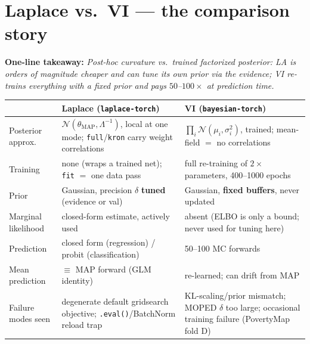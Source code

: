 \documentclass[10pt,a4paper]{article}
\newcommand{\code}[1]{\texttt{#1}}
\newcommand{\map}{\mathrm{MAP}}
\newcommand{\takeaway}[1]{\textbf{One-line takeaway:} \emph{#1}}
\begin{document}
\section{Laplace vs.\ VI --- the comparison story}\label{sec:compare}
\takeaway{Post-hoc curvature vs.\ trained factorized posterior: LA is orders of magnitude cheaper
and can tune its own prior via the evidence; VI re-trains everything with a fixed prior and pays
$50$--$100\times$ at prediction time.}

\begin{center}\small
\begin{tabular}{p{3.0cm}p{5.6cm}p{5.6cm}}
\toprule
& \textbf{Laplace (\code{laplace-torch})} & \textbf{VI (\code{bayesian-torch})}\\
\midrule
Posterior approx. & $\mathcal{N}(\theta_\map,\Lambda^{-1})$, local at one mode; \code{full}/\code{kron}
carry weight correlations & $\prod_i\mathcal{N}(\mu_i,\sigma_i^2)$, trained; mean-field $=$ no
correlations\\
Training & none (wraps a trained net); \code{fit} $=$ one data pass & full re-training of $2\times$
parameters, 400--1000 epochs\\
Prior & Gaussian, precision $\delta$ \textbf{tuned} (evidence or val) & Gaussian, \textbf{fixed
buffers}, never updated\\
Marginal likelihood & closed-form estimate, actively used & absent (ELBO is only a bound; never
used for tuning here)\\
Prediction & closed form (regression) / probit (classification) & 50--100 MC forwards\\
Mean prediction & $\equiv$ MAP forward (GLM identity) & re-learned; can drift from MAP\\
Failure modes seen & degenerate default gridsearch objective; \code{.eval()}/BatchNorm reload trap
& KL-scaling/prior mismatch; MOPED $\delta$ too large; occasional training failure (PovertyMap
fold D)\\
\bottomrule
\end{tabular}
\end{center}
\end{document}
